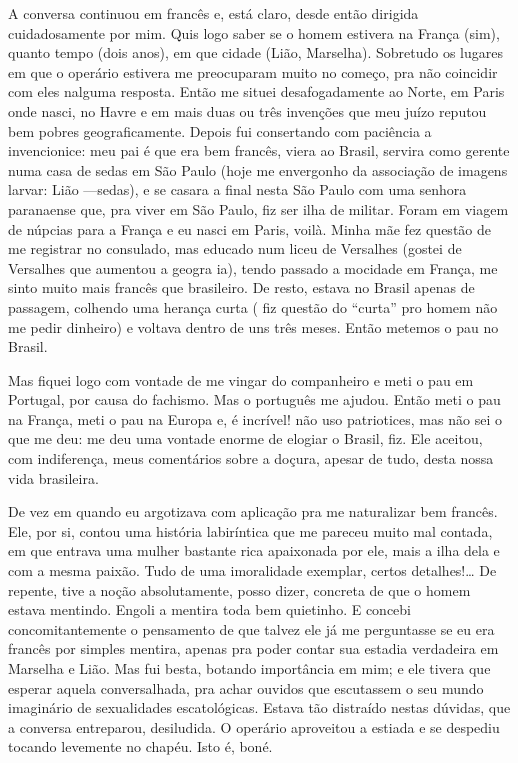 A conversa continuou em francês e, está claro, desde então dirigida
cuidadosamente por mim. Quis logo saber se o homem estivera na França
(sim), quanto tempo (dois anos), em que cidade (Lião, Marselha).
Sobretudo os lugares em que o operário estivera me preocuparam muito no
começo, pra não coincidir com eles nalguma resposta. Então me situei
desafogadamente ao Norte, em Paris onde nasci, no Havre e em mais duas
ou três invenções que meu juízo reputou bem pobres geograficamente.
Depois fui consertando com paciência a invencionice: meu pai é que era
bem francês, viera ao Brasil, servira como gerente numa casa de sedas em
São Paulo (hoje me envergonho da associação de imagens larvar: Lião
---sedas), e se casara a final nesta São Paulo com uma senhora
paranaense que, pra viver em São Paulo, fiz ser ilha de militar. Foram
em viagem de núpcias para a França e eu nasci em Paris, voilà. Minha mãe
fez questão de me registrar no consulado, mas educado num liceu de
Versalhes (gostei de Versalhes que aumentou a geogra ia), tendo passado
a mocidade em França, me sinto muito mais francês que brasileiro. De
resto, estava no Brasil apenas de passagem, colhendo uma herança curta (
fiz questão do ``curta'' pro homem não me pedir dinheiro) e voltava
dentro de uns três meses. Então metemos o pau no Brasil.

Mas fiquei logo com vontade de me vingar do companheiro e meti o pau em
Portugal, por causa do fachismo. Mas o português me ajudou. Então meti o
pau na França, meti o pau na Europa e, é incrível! não uso patriotices,
mas não sei o que me deu: me deu uma vontade enorme de elogiar o Brasil,
fiz. Ele aceitou, com indiferença, meus comentários sobre a doçura,
apesar de tudo, desta nossa vida brasileira.

De vez em quando eu argotizava com aplicação pra me naturalizar bem
francês. Ele, por si, contou uma história labiríntica que me pareceu
muito mal contada, em que entrava uma mulher bastante rica apaixonada
por ele, mais a ilha dela e com a mesma paixão. Tudo de uma imoralidade
exemplar, certos detalhes!\ldots{} De repente, tive a noção absolutamente,
posso dizer, concreta de que o homem estava mentindo. Engoli a mentira
toda bem quietinho. E concebi concomitantemente o pensamento de que
talvez ele já me perguntasse se eu era francês por simples mentira,
apenas pra poder contar sua estadia verdadeira em Marselha e Lião. Mas
fui besta, botando importância em mim; e ele tivera que esperar aquela
conversalhada, pra achar ouvidos que escutassem o seu mundo imaginário
de sexualidades escatológicas. Estava tão distraído nestas dúvidas, que
a conversa entreparou, desiludida. O operário aproveitou a estiada e se
despediu tocando levemente no chapéu. Isto é, boné.

